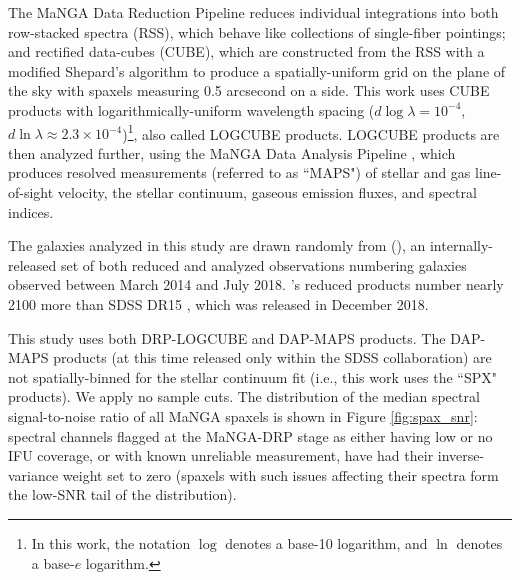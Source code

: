 The MaNGA Data Reduction Pipeline \citep[DRP:][]{manga_drp} reduces individual integrations into both row-stacked spectra (RSS), which behave like collections of single-fiber pointings; and rectified data-cubes (CUBE), which are constructed from the RSS with a modified Shepard's algorithm to produce a spatially-uniform grid on the plane of the sky with spaxels measuring 0.5 arcsecond on a side. This work uses CUBE products with logarithmically-uniform wavelength spacing ($d\log \lambda = 10^{-4}$, $d\ln \lambda \approx 2.3 \times 10^{-4}$)\footnote{In this work, the notation $\log$ denotes a base-10 logarithm, and $\ln$ denotes a base-$e$ logarithm.}, also called LOGCUBE products. LOGCUBE products are then analyzed further, using the MaNGA Data Analysis Pipeline \citep[DAP:][]{manga_dap}, which produces resolved measurements (referred to as ``MAPS") of stellar and gas line-of-sight velocity, the stellar continuum, gaseous emission fluxes, and spectral indices.

The \nrungalaxies galaxies analyzed in this study are drawn randomly from \mplvfull (\mplv), an internally-released set of both reduced and analyzed observations numbering \mplvngal galaxies observed between March 2014 and July 2018. \mplv's reduced products number nearly 2100 more than SDSS DR15 \citep{sdss_dr15}, which was released in December 2018. 

This study uses both DRP-LOGCUBE and DAP-MAPS products. The DAP-MAPS products (at this time released only within the SDSS collaboration) are not spatially-binned for the stellar continuum fit \citep[see][]{manga_dap} (i.e., this work uses the ``SPX" products). We apply no sample cuts. The distribution of the median spectral signal-to-noise ratio of all MaNGA spaxels is shown in Figure \ref{fig:spax_snr}: spectral channels flagged at the MaNGA-DRP stage as either having low or no IFU coverage, or with known unreliable measurement, have had their inverse-variance weight set to zero (spaxels with such issues affecting their spectra form the low-SNR tail of the distribution).

